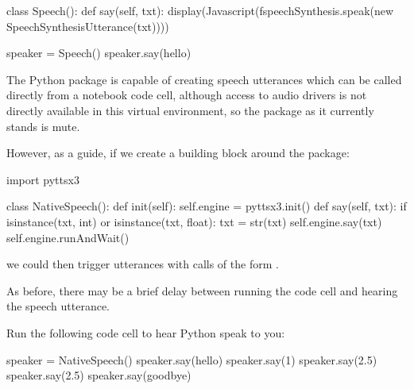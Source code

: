 \documentclass[letterpaper,10pt,english]{sphinxmanual}
\begin{document}
{{\begin{sphinxVerbatim}[commandchars=\\\{\}]
class Speech():
    def say(self, txt):
        display(Javascript(f\PYGZsq{}speechSynthesis.speak(new SpeechSynthesisUtterance(\PYGZdq{}\PYGZob{}txt\PYGZcb{}\PYGZdq{}))\PYGZsq{}))

speaker = Speech()
speaker.say(\PYGZsq{}hello\PYGZsq{})
\end{sphinxVerbatim}
}

The Python  package is capable of creating speech utterances which can be called directly from a notebook code cell, although access to audio drivers is not directly available in this virtual environment, so the package as it currently stands is mute.

However, as a guide, if we create a building block around the package:

{
\begin{sphinxVerbatim}[commandchars=\\\{\}]
\llap{\color{nbsphinxin}[ ]:\,\hspace{\fboxrule}\hspace{\fboxsep}}import pyttsx3

class NativeSpeech():
    def \PYGZus{}\PYGZus{}init\PYGZus{}\PYGZus{}(self):
        self.engine = pyttsx3.init()
    def say(self, txt):
        if isinstance(txt, int) or isinstance(txt, float):
            txt = str(txt)
        self.engine.say(txt)
        self.engine.runAndWait()
\end{sphinxVerbatim}
}

we could then trigger utterances with calls of the form .

As before, there may be a brief delay between running the code cell and hearing the speech utterance.

Run the following code cell to hear Python speak to you:

{
\begin{sphinxVerbatim}[commandchars=\\\{\}]
\llap{\color{nbsphinxin}[ ]:\,\hspace{\fboxrule}\hspace{\fboxsep}}speaker = NativeSpeech()
speaker.say(\PYGZsq{}hello\PYGZsq{})
speaker.say(1)
speaker.say(\PYGZdq{}2.5\PYGZdq{})
speaker.say(2.5)
speaker.say(\PYGZsq{}goodbye\PYGZsq{})
\end{sphinxVerbatim}
}

}
\end{document}
